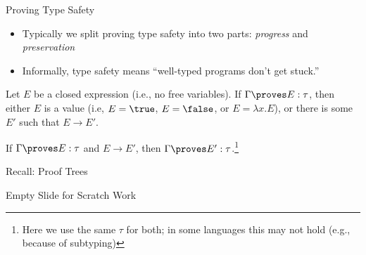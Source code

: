\documentclass[leqno,presentation,usenames,dvipsnames]{beamer}
\begin{document}
\begin{frame}{Proving Type Safety}
    \begin{itemize}
        \item Typically we split proving type safety into two parts: \emph{progress} and \emph{preservation}
        \item Informally, type safety means ``well-typed programs don't get stuck.''
    \end{itemize}

\begin{theorem}[Progress]
    Let $E$ be a closed expression (i.e., no free variables).
    If $\Gamma \proves E : \tau$, then either $E$ is a value (i.e, $E = \true$, $E = \false$, or $E = \lambda x. E$), or there is some $E'$ such that $E \to E'$.
\end{theorem}

\begin{theorem}[Preservation]
    If $\Gamma \proves E : \tau$ and $E \to E'$, then $\Gamma \proves E' : \tau$.\footnote{Here we use the same $\tau$ for both; in some languages this may not hold (e.g., because of subtyping)}
\end{theorem}
\end{frame}

\begin{frame}{Recall: Proof Trees}

\begin{minipage}{\dimexpr\textwidth+3em\relax}
\small
\begin{mathpar}
\end{mathpar}
\end{minipage}
\end{frame}

\begin{frame}{Empty Slide for Scratch Work}
\end{frame}
\end{document}
